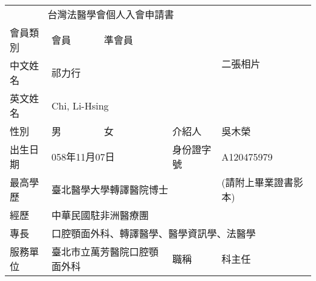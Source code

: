 \documentclass[12pt]{article}
\begin{document}


\begin{table}[]
\centering

\begin{adjustbox}{pagecenter, scale={1}{1.7}}
\begin{tabular}{|lllll|}
\hline
\multicolumn{4}{|c|}{台灣法醫學會個人入會申請書}                                                                                     & \multirow{4}{*}{二張相片} \\ \cline{1-4}
\multicolumn{1}{|l|}{會員類別} & \multicolumn{1}{l|}{會員}         & \multicolumn{1}{l|}{準會員}    & \multicolumn{1}{l|}{}      &                       \\ \cline{1-4}
\multicolumn{1}{|l|}{中文姓名} & \multicolumn{3}{l|}{祁力行}                                                                   &                       \\ \cline{1-4}
\multicolumn{1}{|l|}{英文姓名} & \multicolumn{3}{l|}{Chi, Li-Hsing}                                                         &                       \\ \hline
\multicolumn{1}{|l|}{性別}   & \multicolumn{1}{l|}{男}          & \multicolumn{1}{l|}{女}      & \multicolumn{1}{l|}{介紹人}   & 吳木榮                   \\ \hline
\multicolumn{1}{|l|}{出生日期} & \multicolumn{2}{l|}{058年11月07日}                               & \multicolumn{1}{l|}{身份證字號} & A120475979            \\ \hline
\multicolumn{1}{|l|}{最高學歷} & \multicolumn{3}{l|}{臺北醫學大學轉譯醫院博士}                                                          & (請附上畢業證書影本)           \\ \hline
\multicolumn{1}{|l|}{經歷}   & \multicolumn{4}{l|}{中華民國駐非洲醫療團}                                                                                    \\ \hline
\multicolumn{1}{|l|}{專長}   & \multicolumn{4}{l|}{口腔顎面外科、轉譯醫學、醫學資訊學、法醫學}                                                                         \\ \hline
\multicolumn{1}{|l|}{服務單位} & \multicolumn{2}{l|}{臺北市立萬芳醫院口腔顎面外科}                           & \multicolumn{1}{l|}{職稱}    & 科主任                   \\ \hline

\end{tabular}
\end{adjustbox}
\end{table}
\end{document}
